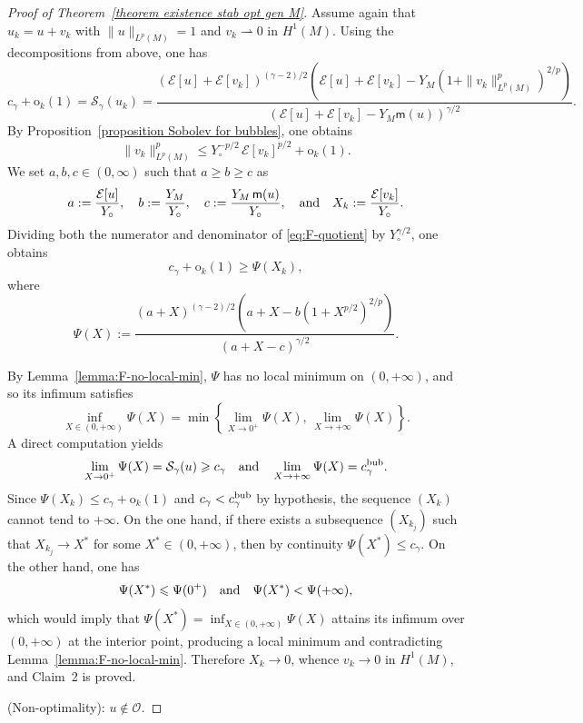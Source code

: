 \documentclass[reqno,11pt]{amsart}
\numberwithin{equation}{section}
\theoremstyle{definition}
\theoremstyle{remark}
\begin{document}
\begin{proof}[Proof of Theorem~\ref{theorem existence stab opt gen M}]
Assume again that $u_k = u + v_k$ with $\|u\|_{L^p(M)} = 1$ and $v_k \rightharpoonup 0$ in $H^1(M)$. Using the decompositions from above, one has
\begin{equation}\label{eq:F-quotient}
c_\gamma + \mathrm{o}_k(1) = \mathcal{S}_\gamma(u_k) = \frac{(\mathcal{E}[u] + \mathcal{E}[v_k])^{(\gamma-2)/2}\left(\mathcal{E}[u] + \mathcal{E}[v_k] - Y_M(1 + \|v_k\|_{L^p(M)}^p)^{2/p}\right)}{(\mathcal{E}[u] + \mathcal{E}[v_k] - Y_M\mathsf{m}(u))^{\gamma/2}}.
\end{equation}
By Proposition~\ref{proposition Sobolev for bubbles}, one obtains
\[
\|v_k\|_{L^p(M)}^p \leqslant Y_\circ^{-p/2}\,\mathcal{E}[v_k]^{p/2} + \mathrm{o}_k(1).
\]
We set $a,b,c\in (0,\infty)$ such that $a \geqslant b \geqslant c$ as
\[
a := \frac{\mathcal{E}[u]}{Y_\circ}, \quad b := \frac{Y_M}{Y_\circ}, \quad c := \frac{Y_M\,\mathsf{m}(u)}{Y_\circ}, \quad {\rm and} \quad X_k := \frac{\mathcal{E}[v_k]}{Y_\circ}.
\]
Dividing both the numerator and denominator of \eqref{eq:F-quotient} by $Y_\circ^{\gamma/2}$, one obtains
\[
c_\gamma + \mathrm{o}_k(1) \geqslant \Psi(X_k),
\]
where
\begin{equation}\label{eq:F-def}
\Psi(X) := \frac{(a + X)^{(\gamma-2)/2}\left(a + X - b(1 + X^{p/2})^{2/p}\right)}{(a + X - c)^{\gamma/2}}.
\end{equation}

By Lemma~\ref{lemma:F-no-local-min}, $\Psi$ has no local minimum on $(0,+\infty)$, and so its infimum satisfies
\[
\inf_{X \in (0,+\infty)} \Psi(X) = \min\left\{\lim_{X \to 0^+} \Psi(X),\, \lim_{X \to +\infty} \Psi(X)\right\}.
\]
A direct computation yields
\[
\lim_{X \to 0^+} \Psi(X) = \mathcal{S}_\gamma(u) \geqslant c_\gamma \quad {\rm and} \quad \lim_{X \to +\infty} \Psi(X) = c_\gamma^{\rm bub}.
\]
Since $\Psi(X_k) \leqslant c_\gamma + \mathrm{o}_k(1)$ and $c_\gamma < c_\gamma^{\rm bub}$ by hypothesis, the sequence $(X_k)$ cannot tend to $+\infty$. On the one hand, if there exists a subsequence $(X_{k_j})$ such that $X_{k_j} \to X^*$ for some $X^* \in (0,+\infty)$, then by continuity $\Psi(X^*) \leqslant c_\gamma$. On the other hand, one has
\[
\Psi(X^*) \leqslant \Psi(0^+) \quad {\rm and} \quad  \Psi(X^*) < \Psi(+\infty),
\]
which would imply that $\Psi(X^*)=\inf_{X\in (0,+\infty)}\Psi(X)$ attains its infimum over $(0,+\infty)$ at the interior point, producing a local minimum and contradicting Lemma~\ref{lemma:F-no-local-min}. Therefore $X_k \to 0$, whence $v_k \to 0$ in $H^1(M)$, and Claim~2 is proved.

\medskip
{} {\rm (Non-optimality):} {\it $u \notin \mathscr{O}$.}


\end{proof}
\end{document}
